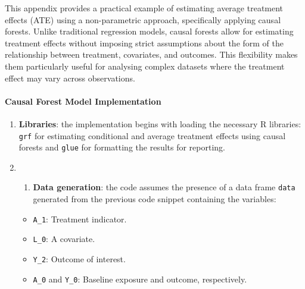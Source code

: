\documentclass[
  singlecolumn]{article}
\let\oldparagraph\paragraph
\renewcommand{\paragraph}[1]{\oldparagraph{#1}\mbox{}}
\providecommand{\tightlist}{%
  \setlength{\itemsep}{0pt}\setlength{\parskip}{0pt}}\usepackage{longtable,booktabs,array}
\begin{document}
This appendix provides a practical example of estimating average
treatment effects (ATE) using a non-parametric approach, specifically
applying causal forests. Unlike traditional regression models, causal
forests allow for estimating treatment effects without imposing strict
assumptions about the form of the relationship between treatment,
covariates, and outcomes. This flexibility makes them particularly
useful for analysing complex datasets where the treatment effect may
vary across observations.

\paragraph{Causal Forest Model
Implementation}\label{causal-forest-model-implementation}

\begin{enumerate}
\def\labelenumi{\arabic{enumi}.}
\item
  \textbf{Libraries}: the implementation begins with loading the
  necessary R libraries: \texttt{grf} for estimating conditional and
  average treatment effects using causal forests and \texttt{glue} for
  formatting the results for reporting.
\item
  \begin{enumerate}
  \def\labelenumii{\arabic{enumii}.}
  \tightlist
  \item
    \textbf{Data generation}: the code assumes the presence of a data
    frame \texttt{data} generated from the previous code snippet
    containing the variables:
  \end{enumerate}

  \begin{itemize}
  \tightlist
  \item
    \texttt{A\_1}: Treatment indicator.
  \item
    \texttt{L\_0}: A covariate.
  \item
    \texttt{Y\_2}: Outcome of interest.
  \item
    \texttt{A\_0} and \texttt{Y\_0}: Baseline exposure and outcome,
    respectively.
  \end{itemize}


\end{enumerate}
\end{document}
